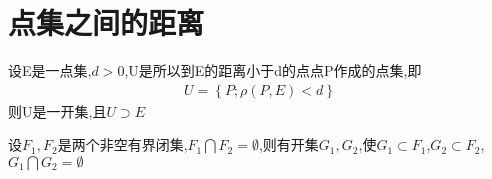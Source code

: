 \section{点集之间的距离}
\begin{Theorem}
    设E是一点集,\(d>0\),U是所以到E的距离小于d的点点P作成的点集,即\begin{align*}
        U = \left\{P ; \rho(P,E) < d\right\}
    \end{align*}
    则U是一开集,且\(U \supset E\)
\end{Theorem}
\begin{Theorem}[隔离性定理]
    设\(F_1,F_2\)是两个非空有界闭集,\(F_1 \bigcap F_2 = \emptyset\),则有开集\(G_1,G_2\),使\(G_1 \subset F_1\),\(G_2 \subset F_2\),\(G_1 \bigcap G_2 = \emptyset\)
\end{Theorem}

